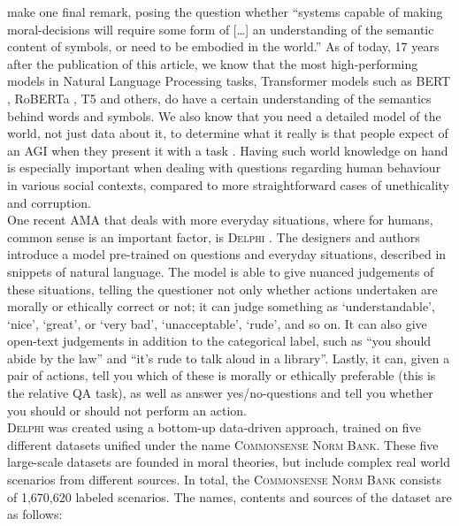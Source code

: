 \documentclass[final]{clv3} %
\begin{document}
\citet[p. 154]{allen2005} make one final remark, posing the question whether “systems capable of making moral-decisions will require some form of […] an understanding of the semantic content of symbols, or need to be embodied in the world.” As of today, 17 years after the publication of this article, we know that the most high-performing models in Natural Language Processing tasks, Transformer models such as BERT \cite{devlin}, RoBERTa \cite{liu}, T5 \cite{raffel} and others, do have a certain understanding of the semantics behind words and symbols. We also know that you need a detailed model of the world, not just data about it, to determine what it really is that people expect of an AGI when they present it with a task \cite{tegmark}. Having such world knowledge on hand is especially important when dealing with questions regarding human behaviour in various social contexts, compared to more straightforward cases of unethicality and corruption. \\

One recent AMA that deals with more everyday situations, where for humans, common sense is an important factor, is \textsc{Delphi} \cite{jiang}. The designers and authors introduce a model pre-trained on questions and everyday situations, described in snippets of natural language. The model is able to give nuanced judgements of these situations, telling the questioner not only whether actions undertaken are morally or ethically correct or not; it can judge something as ‘understandable’, ‘nice’, ‘great’, or ‘very bad’, ‘unacceptable’, ‘rude’, and so on. It can also give open-text judgements in addition to the categorical label, such as “you should abide by the law” and “it’s rude to talk aloud in a library”. Lastly, it can, given a pair of actions, tell you which of these is morally or ethically preferable (this is the relative QA task), as well as answer yes/no-questions and tell you whether you should or should not perform an action.\\

\textsc{Delphi} was created using a bottom-up data-driven approach, trained on five different datasets unified under the name \textsc{Commonsense Norm Bank}. These five large-scale datasets are founded in moral theories, but include complex real world scenarios from different sources. In total, the \textsc{Commonsense Norm Bank} consists of 1,670,620 labeled scenarios. The names, contents and sources of the dataset are as follows:
\end{document}
